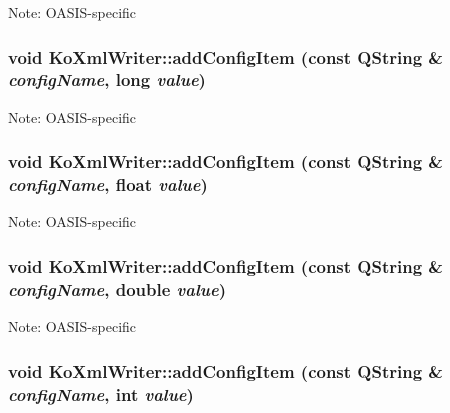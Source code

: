 \begin{Desc}
\item[Note:]OASIS-specific \end{Desc}
\hypertarget{classKoXmlWriter_96dd3ec071587e931296ce5e2b18c1e3}{
\subsubsection[{addConfigItem}]{\setlength{\rightskip}{0pt plus 5cm}void KoXmlWriter::addConfigItem (const QString \& {\em configName}, \/  long {\em value})}}
\label{classKoXmlWriter_96dd3ec071587e931296ce5e2b18c1e3}


\begin{Desc}
\item[Note:]OASIS-specific \end{Desc}
\hypertarget{classKoXmlWriter_3f5fa5e7f6283055cd09c94c8f67206f}{
\subsubsection[{addConfigItem}]{\setlength{\rightskip}{0pt plus 5cm}void KoXmlWriter::addConfigItem (const QString \& {\em configName}, \/  float {\em value})}}
\label{classKoXmlWriter_3f5fa5e7f6283055cd09c94c8f67206f}


\begin{Desc}
\item[Note:]OASIS-specific \end{Desc}
\hypertarget{classKoXmlWriter_3b08df454948731cdf29026298798540}{
\subsubsection[{addConfigItem}]{\setlength{\rightskip}{0pt plus 5cm}void KoXmlWriter::addConfigItem (const QString \& {\em configName}, \/  double {\em value})}}
\label{classKoXmlWriter_3b08df454948731cdf29026298798540}


\begin{Desc}
\item[Note:]OASIS-specific \end{Desc}
\hypertarget{classKoXmlWriter_14522a8ea1c3b25e299319653ba9af9e}{
\subsubsection[{addConfigItem}]{\setlength{\rightskip}{0pt plus 5cm}void KoXmlWriter::addConfigItem (const QString \& {\em configName}, \/  int {\em value})}}
\label{classKoXmlWriter_14522a8ea1c3b25e299319653ba9af9e}


